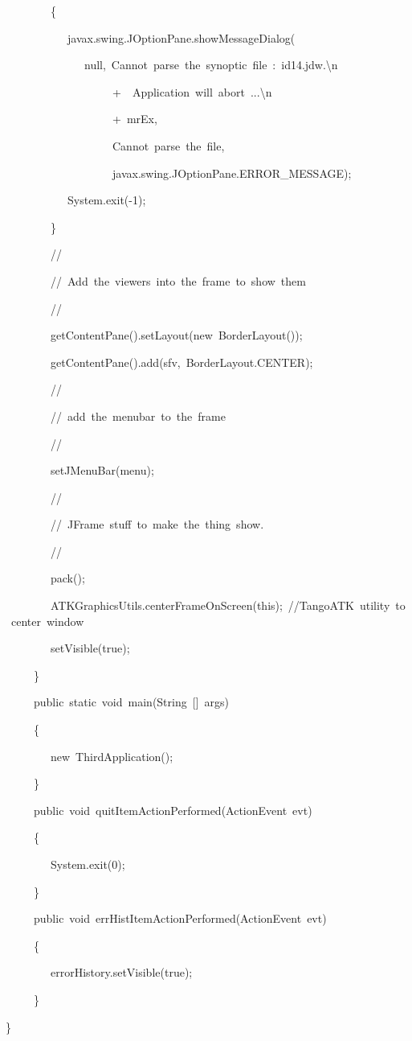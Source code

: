 \begin{lyxcode}
~~~~~~~~\{

~~~~~~~~~~~javax.swing.JOptionPane.showMessageDialog(

~~~~~~~~~~~~~~null,~\textquotedbl{}Cannot~parse~the~synoptic~file~:~id14.jdw.\textbackslash{}n\textquotedbl{}

~~~~~~~~~~~~~~~~~~~+~\textquotedbl{}~Application~will~abort~...\textbackslash{}n\textquotedbl{}

~~~~~~~~~~~~~~~~~~~+~mrEx,

~~~~~~~~~~~~~~~~~~~\textquotedbl{}Cannot~parse~the~file\textquotedbl{},

~~~~~~~~~~~~~~~~~~~javax.swing.JOptionPane.ERROR\_MESSAGE);

~~~~~~~~~~~System.exit(-1);

~~~~~~~~\}

~~~~~~~~//

~~~~~~~~//~Add~the~viewers~into~the~frame~to~show~them

~~~~~~~~//

~~~~~~~~getContentPane().setLayout(new~BorderLayout());

~~~~~~~~getContentPane().add(sfv,~BorderLayout.CENTER);

~~~~~~~~//

~~~~~~~~//~add~the~menubar~to~the~frame

~~~~~~~~//

~~~~~~~~setJMenuBar(menu);

~~~~~~~~//

~~~~~~~~//~JFrame~stuff~to~make~the~thing~show.

~~~~~~~~//

~~~~~~~~pack();

~~~~~~~~ATKGraphicsUtils.centerFrameOnScreen(this);~//TangoATK~utility~to~center~window

~~~~~~~~setVisible(true);

~~~~~\}

~~~~~public~static~void~main(String~{[}{]}~args)

~~~~~\{

~~~~~~~~new~ThirdApplication();

~~~~~\}

~~~~~public~void~quitItemActionPerformed(ActionEvent~evt)

~~~~~\{

~~~~~~~~System.exit(0);

~~~~~\}

~~~~~public~void~errHistItemActionPerformed(ActionEvent~evt)

~~~~~\{

~~~~~~~~errorHistory.setVisible(true);

~~~~~\}

\}

~\\
~\\

\end{lyxcode}

